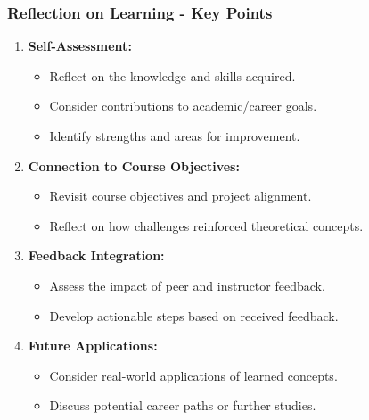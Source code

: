 \documentclass[aspectratio=169]{beamer}
\begin{document}
\begin{frame}[fragile]
    \frametitle{Reflection on Learning - Key Points}
    \begin{enumerate}
        \item \textbf{Self-Assessment:}
            \begin{itemize}
                \item Reflect on the knowledge and skills acquired.
                \item Consider contributions to academic/career goals.
                \item Identify strengths and areas for improvement.
            \end{itemize}
        \item \textbf{Connection to Course Objectives:}
            \begin{itemize}
                \item Revisit course objectives and project alignment.
                \item Reflect on how challenges reinforced theoretical concepts.
            \end{itemize}
        \item \textbf{Feedback Integration:}
            \begin{itemize}
                \item Assess the impact of peer and instructor feedback.
                \item Develop actionable steps based on received feedback.
            \end{itemize}
        \item \textbf{Future Applications:}
            \begin{itemize}
                \item Consider real-world applications of learned concepts.
                \item Discuss potential career paths or further studies.
            \end{itemize}
    \end{enumerate}
\end{frame}
\end{document}
